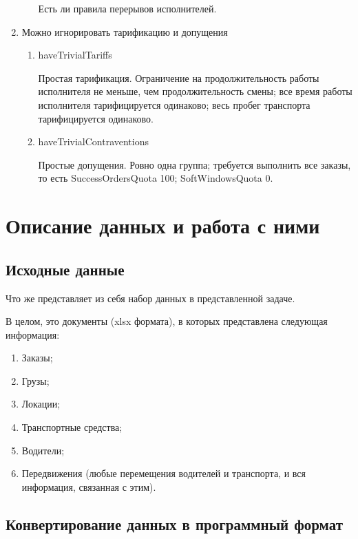 \begin{enumerate}
\begin{enumerate}
	Есть ли правила перерывов исполнителей.
\end{enumerate}

\item Можно игнорировать тарификацию и допущения

\begin{enumerate}

\item haveTrivialTariffs

Простая тарификация. Ограничение на продолжительность работы исполнителя не меньше, чем продолжительность смены; все время работы исполнителя тарифицируется одинаково; весь пробег транспорта тарифицируется одинаково.
\item haveTrivialContraventions

Простые допущения. Ровно одна группа; требуется выполнить все заказы, то есть SuccessOrdersQuota 100; SoftWindowsQuota 0.

\end{enumerate}
\end{enumerate}



\section{Описание данных и работа с ними}

\subsection{Исходные данные}

Что же представляет из себя набор данных в представленной задаче.

В целом, это документы (xlsx формата), в которых представлена следующая информация:

\begin{enumerate}
	\item Заказы;
	\item Грузы;
	\item Локации;
	\item Транспортные средства;
	\item Водители;
	\item Передвижения (любые перемещения водителей и транспорта, и вся информация, связанная с этим).	
\end{enumerate}

\subsection{Конвертирование данных в программный формат}

